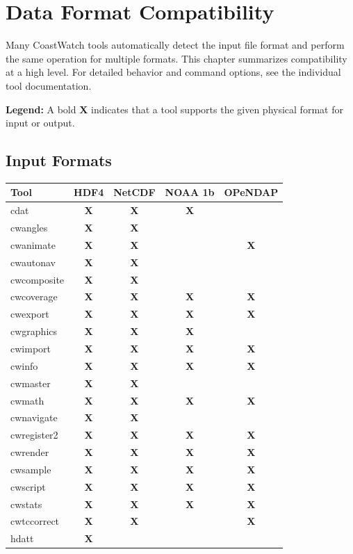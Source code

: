 \chapter{Data Format Compatibility}
\label{compatible}

Many CoastWatch tools automatically detect the input file format and
perform the same operation for multiple formats. This chapter summarizes
compatibility at a high level. For detailed behavior and command options,
see the individual tool documentation.

\noindent\textbf{Legend:} A bold \textbf{X} indicates that a tool supports the
given physical format for input or output.

\section{Input Formats}
\label{input_formats}

\begin{tabular}{lcccc}
\hline
\textbf{Tool} & \textbf{HDF4} & \textbf{NetCDF} & \textbf{NOAA 1b} & \textbf{OPeNDAP} \\
\hline
cdat & \textbf{X} & \textbf{X} & \textbf{X} &  \\
cwangles & \textbf{X} & \textbf{X} &  &  \\
cwanimate & \textbf{X} & \textbf{X} &  & \textbf{X} \\
cwautonav & \textbf{X} & \textbf{X} &  &  \\
cwcomposite & \textbf{X} & \textbf{X} &  &  \\
cwcoverage & \textbf{X} & \textbf{X} & \textbf{X} & \textbf{X} \\
cwexport & \textbf{X} & \textbf{X} & \textbf{X} & \textbf{X} \\
cwgraphics & \textbf{X} & \textbf{X} & \textbf{X} &  \\
cwimport & \textbf{X} & \textbf{X} & \textbf{X} & \textbf{X} \\
cwinfo & \textbf{X} & \textbf{X} & \textbf{X} & \textbf{X} \\
cwmaster & \textbf{X} & \textbf{X} &  &  \\
cwmath & \textbf{X} & \textbf{X} & \textbf{X} & \textbf{X} \\
cwnavigate & \textbf{X} & \textbf{X} &  &  \\
cwregister2 & \textbf{X} & \textbf{X} & \textbf{X} & \textbf{X} \\
cwrender & \textbf{X} & \textbf{X} & \textbf{X} & \textbf{X} \\
cwsample & \textbf{X} & \textbf{X} & \textbf{X} & \textbf{X} \\
cwscript & \textbf{X} & \textbf{X} & \textbf{X} & \textbf{X} \\
cwstats & \textbf{X} & \textbf{X} & \textbf{X} & \textbf{X} \\
cwtccorrect & \textbf{X} & \textbf{X} & & \textbf{X} \\
hdatt & \textbf{X} & & & \\
\hline
\end{tabular}

